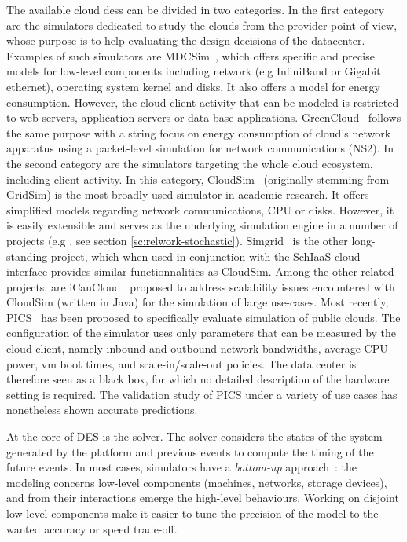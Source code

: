 \documentclass[]{llncs}
\begin{document}
The available  cloud \acp{des} can  be divided in  two categories. In  the first
category are  the simulators  dedicated to  study the  clouds from  the provider
point-of-view, whose purpose  is to help evaluating the design  decisions of the
datacenter. Examples  of such simulators are  MDCSim~\cite{MDCSim}, which offers
specific  and precise  models for  low-level components  including network  (e.g
InfiniBand or  Gigabit ethernet),  operating system kernel  and disks.   It also
offers a model  for energy consumption. However, the cloud  client activity that
can be  modeled is restricted  to web-servers, application-servers  or data-base
applications.   GreenCloud~\cite{greencloud} follows  the  same  purpose with  a
string  focus  on  energy  consumption  of cloud's  network  apparatus  using  a
packet-level  simulation  for  network  communications  (NS2).   In  the  second
category  are the  simulators  targeting the  whole  cloud ecosystem,  including
client activity. In this category, CloudSim~\cite{cloudsim} (originally stemming
from  GridSim) is  the most  broadly used  simulator in  academic research.   It
offers simplified models regarding network communications, CPU or disks. However,
it is  easily extensible  and serves  as the underlying  simulation engine  in a
number of projects (e.g  \cite{Cai17}, see section \ref{sc:relwork-stochastic}).
Simgrid~\cite{simgrid} is  the other long-standing  project, which when  used in
conjunction with  the SchIaaS cloud interface  provides similar functionnalities
as CloudSim.   Among the other related  projects, are iCanCloud~\cite{iCanCloud}
proposed to  address scalability  issues encountered  with CloudSim  (written in
Java) for the simulation of large use-cases. Most recently, PICS~\cite{pics} has
been  proposed  to  specifically  evaluate simulation  of  public  clouds.   The
configuration of the simulator uses only  parameters that can be measured by the
cloud client, namely inbound and  outbound network bandwidths, average CPU power,
\ac{vm} boot times, and scale-in/scale-out  policies. The data center is therefore %
seen as a black  box, for which no detailed description  of the hardware setting
is required.  The validation  study of  PICS under  a variety  of use  cases has
nonetheless shown accurate predictions.

At the core of DES is the solver.  The solver considers the states of the system
generated  by the  platform and  previous events  to compute  the timing  of the
future events. %
In  most  cases, simulators  have  a  \emph{bottom-up} approach~:  the  modeling
concerns low-level  components (machines,  networks, storage devices),  and from
their interactions  emerge the high-level  behaviours. Working on  disjoint low
level components make it easier to tune the precision of the model to the wanted
accuracy or speed trade-off.
\end{document}
